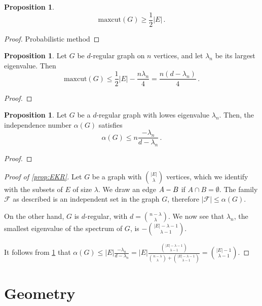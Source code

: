 \documentclass[12pt]{amsart}
\theoremstyle{definition}
\newtheorem{prop}[thm]{Proposition}
\newcommand{\FF}{\mathcal F}
\newcommand{\maxcut}{\mathrm{maxcut}}
\begin{document}
\begin{prop}
$$\maxcut(G) \geq \frac{1}{2}|E| \, .$$
\end{prop}

\begin{proof}
Probabilistic method
\end{proof}


\begin{prop}
Let $G$ be $d$-regular graph on $n$ vertices, and let $\lambda_n$ be its largest eigenvalue.
Then 
$$\maxcut(G) \leq \frac{1}{2} |E| - \frac{n \lambda_n}{4} = \frac{n (d-\lambda_n)}{4} \, . $$
\end{prop}

\begin{proof}

\end{proof}

\begin{prop}\label{prop:indep_bound}
Let $G$ be a $d$-regular graph with lowes eigenvalue $\lambda_n$.
Then, the independence number $\alpha(G)$ satisfies
$$\alpha(G) \leq n \frac{-\lambda_n}{d - \lambda_n}\, . $$
\end{prop}

\begin{proof}

\end{proof}

\begin{proof}[Proof of \cref{prop:EKR}]
Let $G$ be a graph with $\binom{|E|}{\lambda}$ vertices, which we identify with the subsets of $E$ of size $\lambda$.
We draw an edge $A \-- B$ if $A \cap B = \emptyset $.
The family $\FF $ as described is an independent set in the graph $G$, therefore $|\FF | \leq \alpha (G)$.

On the other hand, $G$ is $d$-regular, with $d = \binom{n - \lambda}{ \lambda}$.
We now see that $\lambda_n$, the smallest eigenvalue of the spectrum of $G$, is $-\binom{|E| - \lambda - 1}{\lambda - 1}$.

It follows from \cref{prop:indep_bound} that $\alpha(G) \leq |E|\frac{-\lambda_n}{d - \lambda_n} = |E|\frac{\binom{|E| - \lambda - 1}{\lambda - 1}}{\binom{n - \lambda}{\lambda} + \binom{|E| - \lambda - 1}{\lambda - 1}} = \binom{|E|-1}{\lambda - 1}$.
\end{proof}


\section{Geometry}
\end{document}
